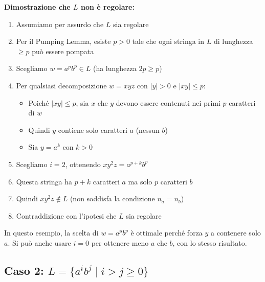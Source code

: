 \documentclass[12pt,a4paper]{article}
\begin{document}
\begin{risoluzione}
\textbf{Dimostrazione che $L$ non è regolare:}
\begin{enumerate}
    \item Assumiamo per assurdo che $L$ sia regolare
    \item Per il Pumping Lemma, esiste $p > 0$ tale che ogni stringa in $L$ di lunghezza $\geq p$ può essere pompata
    \item Scegliamo $w = a^p b^p \in L$ (ha lunghezza $2p \geq p$)
    \item Per qualsiasi decomposizione $w = xyz$ con $|y| > 0$ e $|xy| \leq p$:
    \begin{itemize}
        \item Poiché $|xy| \leq p$, sia $x$ che $y$ devono essere contenuti nei primi $p$ caratteri di $w$
        \item Quindi $y$ contiene solo caratteri $a$ (nessun $b$)
        \item Sia $y = a^k$ con $k > 0$
    \end{itemize}
    \item Scegliamo $i = 2$, ottenendo $xy^2z = a^{p+k}b^p$
    \item Questa stringa ha $p+k$ caratteri $a$ ma solo $p$ caratteri $b$
    \item Quindi $xy^2z \not\in L$ (non soddisfa la condizione $n_a = n_b$)
    \item Contraddizione con l'ipotesi che $L$ sia regolare
\end{enumerate}
\end{risoluzione}

\begin{suggerimento}
In questo esempio, la scelta di $w = a^p b^p$ è ottimale perché forza $y$ a contenere solo $a$. Si può anche usare $i = 0$ per ottenere meno $a$ che $b$, con lo stesso risultato.
\end{suggerimento}

\subsection{Caso 2: $L = \{a^i b^j \mid i > j \geq 0\}$}
\end{document}
